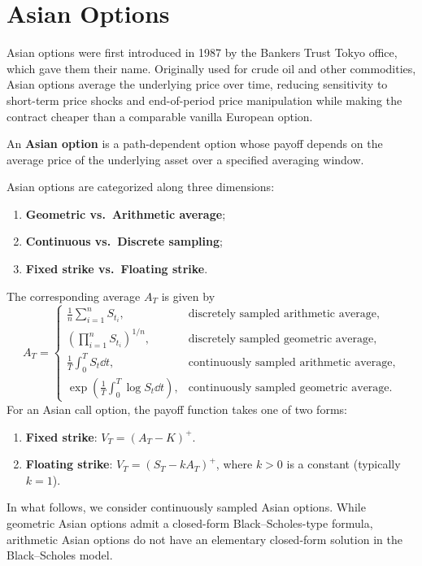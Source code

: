 \section{Asian Options}

Asian options were first introduced in 1987 by the Bankers Trust Tokyo office, which gave them their name. Originally used for crude oil and other commodities, Asian options average the underlying price over time, reducing sensitivity to short-term price shocks and end-of-period price manipulation while making the contract cheaper than a comparable vanilla European option.

\begin{definition}\label{def:asian-option}
    An \textbf{Asian option} is a path-dependent option whose payoff depends on the average price of the underlying asset over a specified averaging window.
\end{definition}

Asian options are categorized along three dimensions:
\begin{enumerate}
    \item \textbf{Geometric vs.\ Arithmetic average};
    \item \textbf{Continuous vs.\ Discrete sampling};
    \item \textbf{Fixed strike vs.\ Floating strike}.
\end{enumerate}
The corresponding average $A_T$ is given by
\[
A_T = \begin{cases}
    \displaystyle \frac{1}{n}\sum_{i=1}^n S_{t_i}, & \text{discretely sampled arithmetic average}, \\[8pt]
    \displaystyle \left(\prod_{i=1}^n S_{t_i}\right)^{1/n}, & \text{discretely sampled geometric average}, \\[8pt]
    \displaystyle \frac{1}{T}\int_0^T S_t \dd t, & \text{continuously sampled arithmetic average}, \\[8pt]
    \displaystyle \exp\left(\frac{1}{T}\int_0^T \log S_t \dd t\right), & \text{continuously sampled geometric average}.
\end{cases}
\]
For an Asian call option, the payoff function takes one of two forms:
\begin{enumerate}
    \item \textbf{Fixed strike}: $V_T = (A_T - K)^+$.
    \item \textbf{Floating strike}: $V_T = (S_T - k A_T)^+$, where $k > 0$ is a constant (typically $k = 1$).
\end{enumerate}
In what follows, we consider continuously sampled Asian options. While geometric Asian options admit a closed-form Black--Scholes-type formula, arithmetic Asian options do not have an elementary closed-form solution in the Black--Scholes model.

